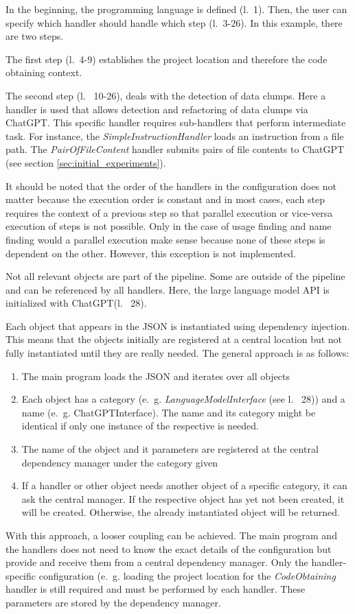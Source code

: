 In the beginning, the programming language is defined (l.~1). Then, the user can specify which handler should handle which step (l.~3-26). In this example, there are two steps. 

The first step (l.~4-9) establishes the project location and therefore the code obtaining context.

The second step (l.~ 10-26), deals with the detection of data clumps. Here a handler is used that allows detection and refactoring of data clumps via ChatGPT. This specific handler requires sub-handlers that perform intermediate task. For instance, the \textit{SimpleInstructionHandler} loads an instruction from a file path. The \textit{PairOfFileContent} handler submits pairs of file contents to ChatGPT (see section \ref{sec:initial_experiments}).

It should be noted that the order of the handlers in the configuration  does not matter because the execution order is constant and in most cases, each step requires the context of a previous step so that parallel execution or vice-versa execution of steps is not possible. Only in the case of usage finding and name finding would a parallel execution make sense because none of these steps is dependent on the other.  However, this exception is not implemented.

Not all relevant objects are part of the pipeline. Some are outside of the pipeline and can be referenced by all handlers. Here, the large language model \ac{API} is initialized with ChatGPT(l.~ 28).

Each object that appears in the \ac{JSON} is instantiated using dependency injection. This means that the objects initially are registered at a central location but not fully instantiated until they are really needed. The general approach is as follows:
\begin{enumerate}
    \item The main program loads the \ac{JSON} and iterates over all objects
    \item Each object has a category (e.~g. \textit{LanguageModelInterface} (see l.~ 28)) and a name (e.~g. ChatGPTInterface). The name and its category might be identical if only one instance of the respective is needed. 
    \item The name of the object and it parameters are registered at the central dependency manager under the category given
    \item If a handler or other object needs another object of a specific category, it can ask the central manager. If the respective object has  yet not been created, it will be created. Otherwise, the already instantiated object will be returned. 
\end{enumerate}
With this approach, a looser coupling can be achieved. The main program and the handlers does not need to know the exact details of the configuration but provide and receive them from a central dependency manager. Only the handler-specific configuration (e.~g. loading the project location  for the \textit{CodeObtaining} handler is still required and must be performed by each handler. These parameters are stored by the dependency manager. 
